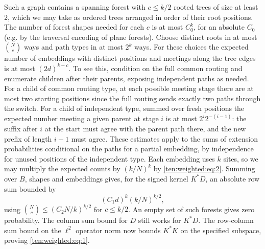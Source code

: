 Such a graph contains a spanning forest with \(c\le k/2\) rooted trees of size at least 2, which we may take as ordered trees arranged in order of their root positions. The number of forest shapes needed for each \(c\) is at most \(C_0^k\), for an absolute \(C_0\) (e.g. by the traversal encoding of plane forests). Choose distinct roots in at most \(\binom Nc\) ways and path types in at most \(2^k\) ways. For these choices the expected number of embeddings with distinct positions and meetings along the tree edges is at most \((2d)^{k-c}\). To see this, condition on the full common routing and enumerate children after their parents, exposing independent paths as needed. For a child of common routing type, at each possible meeting stage there are at most two starting positions since the full routing sends exactly two paths through the switch. For a child of independent type, summed over fresh positions the expected number meeting a given parent at stage \(i\) is at most \(2^i 2^{-(i-1)}\): the suffix after \(i\) at the start must agree with the parent path there, and the new prefix of length \(i-1\) must agree. These estimates apply to the sums of extension probabilities conditional on the paths for a partial embedding, by independence for unused positions of the independent type. Each embedding uses \(k\) sites, so we may multiply the expected counts by \((k/N)^k\) by \eqref{ten:weighted:eq:2}. Summing over \(B\), shapes and embeddings gives, for the signed kernel \(K^*D\), an absolute row sum bounded by
\[
 (C_1 d)^k (k/N)^{k/2},
\]
using \(\binom Nc\le (C_2 N/k)^{k/2}\) for \(c\le k/2\). An empty set of such forests gives zero probability. The column sum bound for \(D\) still works for \(K^*D\). The row-column sum bound on the \(\ell^2\) operator norm now bounds \(K^*K\) on the specified subspace, proving \eqref{ten:weighted:eq:1}.


